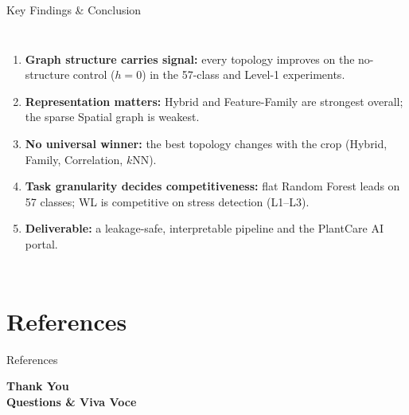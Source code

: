 \documentclass[aspectratio=169, 11pt]{beamer}
\begin{document}
\begin{frame}{Key Findings \& Conclusion}
    \begin{columns}[T]
        \footnotesize
        \begin{enumerate}
            \item \textbf{Graph structure carries signal:} every topology improves on the no-structure control ($h=0$) in the 57-class and Level-1 experiments.
            \item \textbf{Representation matters:} Hybrid and Feature-Family are strongest overall; the sparse Spatial graph is weakest.
            \item \textbf{No universal winner:} the best topology changes with the crop (Hybrid, Family, Correlation, $k$NN).
            \item \textbf{Task granularity decides competitiveness:} flat Random Forest leads on 57 classes; WL is competitive on stress detection (L1--L3).
            \item \textbf{Deliverable:} a leakage-safe, interpretable pipeline and the PlantCare AI portal.
        \end{enumerate}

    \end{columns}
\end{frame}

\section{References}
\begin{frame}[allowframebreaks]{References}
    \tiny
    
    
\end{frame}

\begin{frame}
    \centering
    {\Huge \textbf{\textcolor{amritaMaroon}{Thank You}}} \\[0.4cm]
    {\large \textbf{Questions \& Viva Voce}}
\end{frame}
\end{document}
